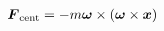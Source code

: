 \documentclass[10pt]{article}
\begin{document}
\begin{align*}{\boldsymbol F}_{\rm cent} =  - m  {\boldsymbol \omega }\times \left( { \boldsymbol \omega  }\times { \boldsymbol x } \right) \end{align*}
\end{document}
